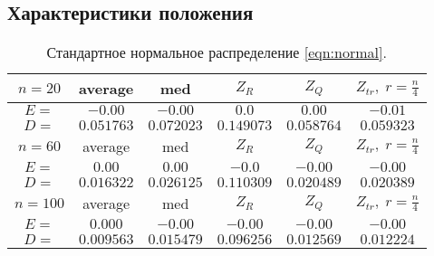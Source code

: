 \documentclass[a4]{article}
\begin{document}
\subsection{Характеристики положения}
\begin{table}[H]
\caption{\label{tab:normal} Стандартное нормальное распределение \eqref{eqn:normal}.}
\begin{center}
\begin{tabular}{|c|c|c|c|c|c|}
\hline
$n = 20$ & average & med & $Z_R$ & $Z_Q$ & $Z_{tr},\;r=\frac{n}{4}$\\
\hline
$E =$ & $-0.00$ & $-0.00$ & $0.0$ & $0.00$ & $-0.01$\\
\hline
$D =$ & $0.051763$ & $0.072023$ & $0.149073$ & $0.058764$ & $0.059323$\\
\hline
$n = 60$ & average & med & $Z_R$ & $Z_Q$ & $Z_{tr},\;r=\frac{n}{4}$\\
\hline
$E =$ & $0.00$ & $0.00$ & $-0.0$ & $-0.00$ & $-0.00$\\
\hline
$D =$ & $0.016322$ & $0.026125$ & $0.110309$ & $0.020489$ & $0.020389$\\
\hline
$n = 100$ & average & med & $Z_R$ & $Z_Q$ & $Z_{tr},\;r=\frac{n}{4}$\\
\hline
$E =$ & $0.000$ & $-0.00$ & $-0.00$ & $-0.00$ & $-0.00$\\
\hline
$D =$ & $0.009563$ & $0.015479$ & $0.096256$ & $0.012569$ & $0.012224$\\
\hline
\end{tabular}
\end{center}
\end{table}
\end{document}
